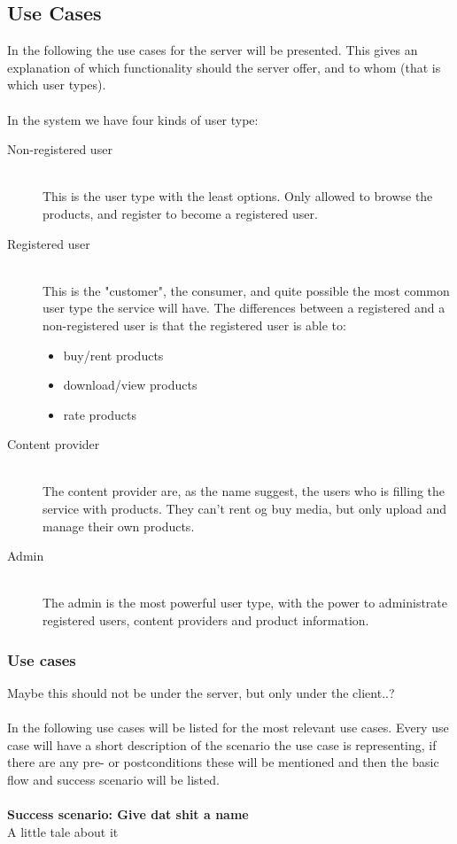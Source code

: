 \subsection{Use Cases}
In the following the use cases for the server will be presented. This gives an explanation of which functionality should the server offer, and to whom (that is which user types).
\\ \\
In the system we have four kinds of user type:
\begin{description}
	\item [Non-registered user] \hfill \\
		This is the user type with the least options. Only allowed to browse the products, and register to become a registered user.
	\item [Registered user]  \hfill \\
		This is the "customer", the consumer, and quite possible the most common user type the service will have. The differences between a registered and a non-registered user is that the registered user is able to:
		\begin{itemize}
			\item buy/rent products
			\item download/view products
			\item rate products
		\end{itemize}
	\item [Content provider] \hfill \\
		The content provider are, as the name suggest, the users who is filling the service with products. They can't rent og buy media, but only upload and manage their own products.
	\item [Admin] \hfill \\
		The admin is the most powerful user type, with the power to administrate registered users, content providers and product information.
\end{description}

\subsubsection{Use cases}

Maybe this should not be under the server, but only under the client..?\\\\
In the following use cases will be listed for the most relevant use cases. Every use case will have a short description of the scenario the use case is representing, if there are any pre- or postconditions these will be mentioned and then the basic flow and success scenario will be listed.
\\\\
\textbf{Success scenario: Give dat shit a name} \\
A little tale about it

